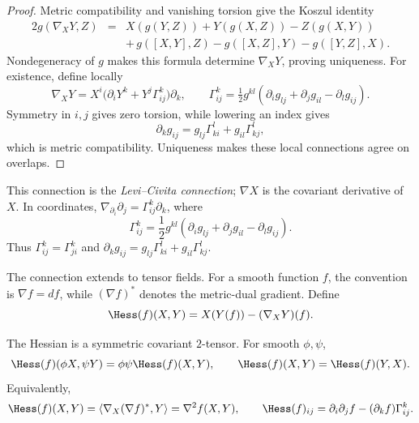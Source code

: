 \begin{proof}
\sketch
{}
\leanok
Metric compatibility and vanishing torsion give the Koszul identity
\begin{eqnarray}\label{Koszul}
2g(\nabla_XY,Z) & = & X(g(Y,Z))+Y(g(X,Z))-Z(g(X,Y)) \\
& & +\, g([X,Y],Z)-g([X,Z],Y)-g([Y,Z],X). \nonumber
\end{eqnarray}
Nondegeneracy of $g$ makes this formula determine $\nabla_XY$, proving
uniqueness. For existence, define locally
\[
  \nabla_XY=X^i\bigl(\partial_iY^k+Y^j\Gamma^k_{ij}\bigr)\partial_k,
  \qquad
  \Gamma^k_{ij}=\tfrac12g^{kl}
  (\partial_i g_{lj}+\partial_j g_{il}-\partial_l g_{ij}).
\]
Symmetry in $i,j$ gives zero torsion, while lowering an index gives
\[
  \partial_k g_{ij}=g_{lj}\Gamma^l_{ki}+g_{il}\Gamma^l_{kj},
\]
which is metric compatibility. Uniqueness makes these local connections
agree on overlaps.
\end{proof}

This connection is the \emph{Levi--Civita connection}; $\nabla X$ is
the covariant derivative of $X$. In coordinates,
$\nabla_{\partial_i}\partial_j=\Gamma^k_{ij}\partial_k$, where
\begin{equation}\label{Gamma}
  \Gamma^{k}_{ij}=\frac12g^{kl}
  (\partial_i g_{lj}+\partial_j g_{il}-\partial_l g_{ij}).
\end{equation}
Thus $\Gamma^k_{ij}=\Gamma^k_{ji}$ and
$\partial_k g_{ij}=g_{lj}\Gamma^l_{ki}+g_{il}\Gamma^l_{kj}$.

The connection extends to tensor fields. For a smooth function $f$,
the convention is $\nabla f=df$, while $(\nabla f)^*$ denotes the
metric-dual gradient. Define
\begin{equation}\label{Hessian}
  \Hess(f)(X,Y)=X(Y(f))-(\nabla_XY)(f).
\end{equation}
\begin{lemma}
\label{lem:hessian-symmetric}
\leanok
\label{Hessformula}



The Hessian is a symmetric covariant $2$-tensor. For smooth
$\phi,\psi$,
\[
  \Hess(f)(\phi X,\psi Y)=\phi\psi\Hess(f)(X,Y),
  \qquad \Hess(f)(X,Y)=\Hess(f)(Y,X).
\]
Equivalently,
\[
  \Hess(f)(X,Y)=\langle\nabla_X(\nabla f)^*,Y\rangle
  =\nabla^2f(X,Y),
  \qquad
  \Hess(f)_{ij}=\partial_i\partial_jf-(\partial_kf)\Gamma^k_{ij}.
\]
\end{lemma}

